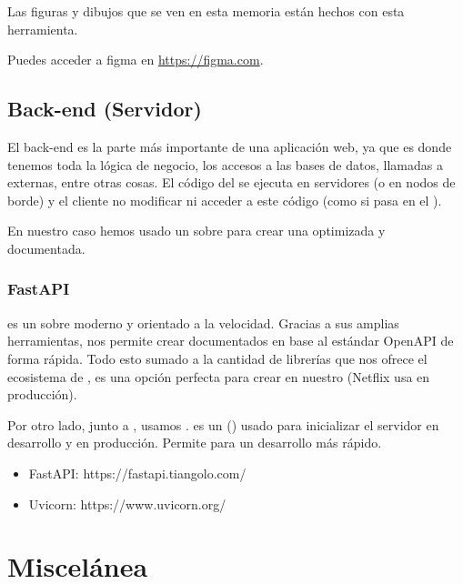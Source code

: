 Las figuras y dibujos que se ven en esta memoria están hechos con esta herramienta.

Puedes acceder a figma en \url{https://figma.com}.

\subsection{Back-end (Servidor)}

El back-end es la parte más importante de una aplicación web, ya que es donde tenemos toda la lógica de negocio, los accesos a las bases de datos, llamadas a  externas, entre otras cosas. El código del  se ejecuta en servidores (o en nodos de borde) y el cliente no modificar ni acceder a este código (como si pasa en el  ).

En nuestro caso hemos usado un  sobre  para crear una  optimizada y documentada.

\subsubsection{FastAPI}

 es un  sobre  moderno y orientado a la velocidad. Gracias a sus amplias herramientas, nos permite crear  documentados en base al estándar OpenAPI de forma rápida. Todo esto sumado a la cantidad de librerías que nos ofrece el ecosistema de ,  es una opción perfecta para crear  en nuestro  (Netflix usa  en producción).

Por otro lado, junto a , usamos .  es un  ()  usado para inicializar el servidor en desarrollo y en producción. Permite  para un desarrollo más rápido.

\begin{itemize}
  \item FastAPI: https://fastapi.tiangolo.com/
  \item Uvicorn: https://www.uvicorn.org/
\end{itemize}


\section{Miscelánea}

